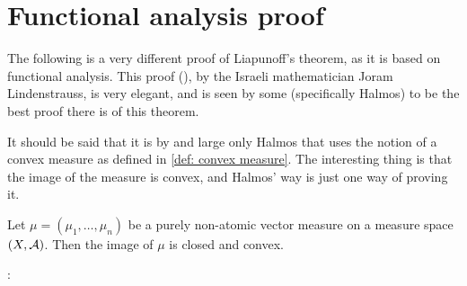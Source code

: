 \documentclass[../../main.tex]{subfiles}
\begin{document}
\section{Functional analysis proof}

The following is a very different proof of Liapunoff's theorem, as it is based on functional analysis. This proof (\cite{Lindenstrauss66}), by the Israeli mathematician Joram Lindenstrauss, is very elegant, and is seen by some (specifically Halmos) to be the best proof there is of this theorem.

It should be said that it is by and large only Halmos that uses the notion of a convex measure as defined in \ref{def: convex measure}. The interesting thing is that the image of the measure is convex, and Halmos' way is just one way of proving it.

\begin{theorem}\label{thm: Lindenstrauss}
Let $\mu=(\mu_{1}, \dots, \mu_{n})$ be a purely non-atomic vector measure on a measure space $(X, \mathcal{A})$. Then the image of $\mu$ is closed and convex.
\end{theorem}:
\end{document}
